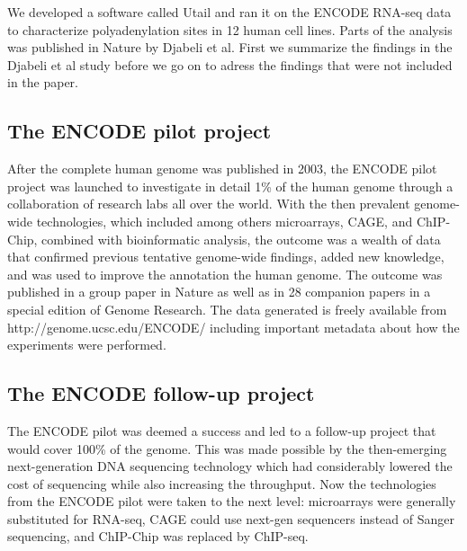 %








We developed a software called Utail and ran it on the ENCODE RNA-seq data to
characterize polyadenylation sites in 12 human cell lines. Parts of the
analysis was published in Nature by Djabeli et al. First we summarize the
findings in the Djabeli et al study before we go on to adress the findings that
were not included in the paper.

\subsection{The ENCODE pilot project}
After the complete human genome was published in 2003, the ENCODE pilot project
was launched to investigate in detail 1\% of the human genome through a
collaboration of research labs all over the world. With the then prevalent genome-wide
technologies, which included among others microarrays, CAGE, and ChIP-Chip,
combined with bioinformatic analysis, the outcome was a wealth of data that
confirmed previous tentative genome-wide findings, added new knowledge, and was
used to improve the annotation the human genome. The outcome was published in a
group paper in Nature \cite{birney_identification_2007} as well as in 28
companion papers in a special edition of Genome Research. The data generated
is freely available from http://genome.ucsc.edu/ENCODE/ including important
metadata about how the experiments were performed.

\subsection{The ENCODE follow-up project}
The ENCODE pilot was deemed a success and led to a follow-up project that would
cover 100\% of the genome. This was made possible by the then-emerging
next-generation DNA sequencing technology which had considerably lowered the
cost of sequencing while also increasing the throughput. Now the technologies
from the ENCODE pilot were taken to the next level: microarrays were generally
substituted for RNA-seq, CAGE could use next-gen sequencers instead of Sanger
sequencing, and ChIP-Chip was replaced by ChIP-seq.

